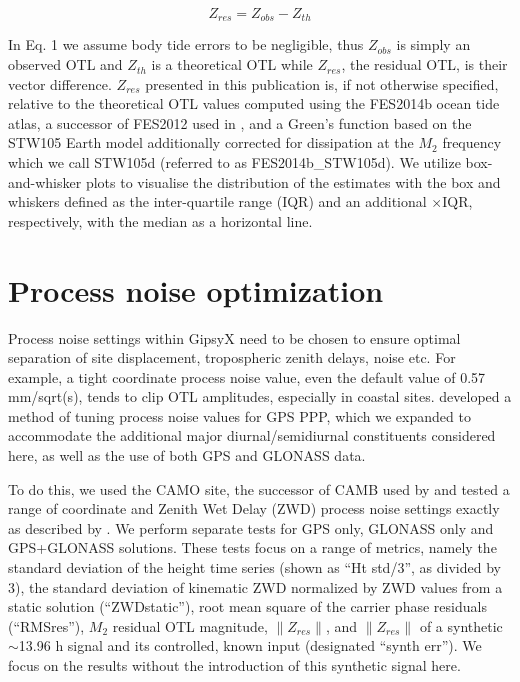 \documentclass[se, manuscript]{copernicus}
\begin{document}
\begin{equation}
Z_{res} = Z_{obs}- Z_{th}
\end{equation}

In Eq. 1 we assume body tide errors to be negligible, thus $Z_{obs}$ is simply an observed OTL and $Z_{th}$ is a theoretical OTL while $Z_{res}$, the residual OTL, is their vector difference. $Z_{res}$ presented in this publication is, if not otherwise specified, relative to the theoretical OTL values computed using the FES2014b ocean tide atlas, a successor of FES2012 used in \cite{Bos2015}, and a Green’s function based on the STW105 Earth model additionally corrected for dissipation at the $M_2$ frequency which we call STW105d (referred to as FES2014b\_STW105d). We utilize box-and-whisker plots to visualise the distribution of the estimates with the box and whiskers defined as the inter-quartile range (IQR) and an additional $\times \text{IQR}$, respectively, with the median as a horizontal line.

\section{Process noise optimization}
Process noise settings within GipsyX need to be chosen to ensure optimal separation of site displacement, tropospheric zenith delays, noise etc. For example, a tight coordinate process noise value, even the default value of 0.57 mm/sqrt(s), tends to clip OTL amplitudes, especially in coastal sites. \cite{Penna2015} developed a method of tuning process noise values for GPS PPP, which we expanded to accommodate the additional major diurnal/semidiurnal constituents considered here, as well as the use of both GPS and GLONASS data.

To do this, we used the CAMO site, the successor of CAMB used by \cite{Penna2015} and tested a range of coordinate and Zenith Wet Delay (ZWD) process noise settings exactly as described by \cite{Penna2015}. We perform separate tests for GPS only, GLONASS only and GPS+GLONASS solutions. These tests focus on a range of metrics, namely the standard deviation of the height time series (shown as “Ht std/3”, as divided by 3), the standard deviation of kinematic ZWD normalized by ZWD values from a static solution (“ZWDstatic”), root mean square of the carrier phase residuals (“RMSres”), $M_2$ residual OTL magnitude, $\|Z_{res}\|$, and $\|Z_{res}\|$ of a synthetic $\sim$13.96 h signal and its controlled, known input (designated “synth err”). We focus on the results without the introduction of this synthetic signal here.
\end{document}

